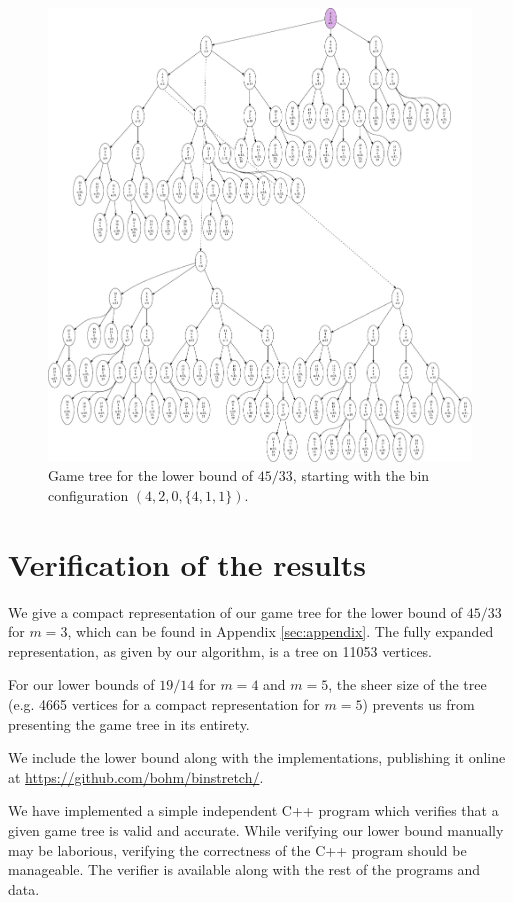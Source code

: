 \begin{figure}
  \includegraphics[scale=0.6]{img/4-2-0.pdf}
  \caption{Game tree for the lower bound of $45/33$, starting with the bin configuration $(4,2,0,\{4,1,1\})$.}
\end{figure}

\section{Verification of the results}\label{sec:verification}


We give a compact representation of our game tree for the lower bound
of $45/33$ for $m=3$, which can be found in Appendix
\ref{sec:appendix}. The fully expanded representation, as given by our
algorithm, is a tree on 11053 vertices.

For our lower bounds of $19/14$ for $m=4$ and $m=5$, the sheer size of
the tree (e.g. 4665 vertices for a compact representation for $m = 5$) prevents us from
presenting the game tree in its entirety.

We include the lower bound along with the implementations, publishing
it online at
\url{https://github.com/bohm/binstretch/}.

We have implemented a simple independent C++ program which verifies
that a given game tree is valid and accurate. While verifying our
lower bound manually may be laborious, verifying the correctness of
the C++ program should be manageable. The verifier is available along
with the rest of the programs and data.